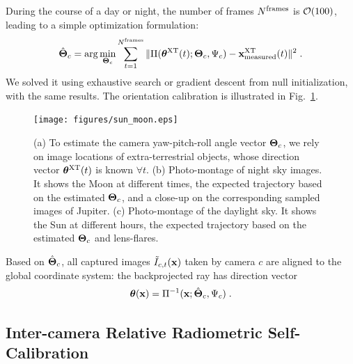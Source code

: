 \documentclass[runningheads]{llncs}
\begin{document}
During the course of a day or night, the number of frames
  $N^{\rm frames}$ is ${\cal O}(100)$, leading to a simple optimization formulation:
\begin{equation}
 \hat{\bf \Theta}_c=\arg\min_{{\bf \Theta}_c}
 \sum_{t=1}^{N^{\rm frames}}
 \|{\Pi}({\bm \theta}^{\rm XT}(t);{\bf \Theta}_c,\Psi_c) - {\bf x}^{\rm XT}_{\rm measured}(t)\|^2
\;.
 \label{eq:hatThetac}
\end{equation}
We solved it using exhaustive search or gradient descent from null initialization, with the same results. The orientation calibration is illustrated in Fig.~\ref{fig:sunmotion}.


\begin{figure}[t!]
\begin{center}
   \texttt{[image: figures/sun\_moon.eps]}
\end{center}
   \vspace{-0.6cm}
   \caption{(a) To estimate the camera yaw-pitch-roll angle vector ${\bf \Theta}_c$, we rely on
   image locations of extra-terrestrial objects, whose direction vector ${\bm \theta}^{\rm XT}(t)$
   is known $\forall t$. (b) Photo-montage of night sky images. It shows the Moon at different times, the expected trajectory based on the estimated ${\bf \Theta}_c$, and a close-up on the corresponding sampled images of Jupiter. (c) Photo-montage of the daylight sky. It shows the Sun at different hours, the expected trajectory based on the estimated ${\bf \Theta}_c$ and lens-flares.
   }
\label{fig:sunmotion}
\end{figure}
Based on $\hat{\bf \Theta}_c$, all captured images $\tilde I_{c,t}(\bf x)$ taken by camera $c$ are aligned to the global coordinate system:
the backprojected ray has direction vector %
\begin{equation}
 {\bm \theta}({\bf x})={\Pi}^{-1}({\bf x};\hat{\bf{\Theta}}_c,\Psi_c)
  \;.
 \label{eq:thetac}
\end{equation}



\subsection*{Inter-camera Relative Radiometric Self-Calibration}
\label{sec:mutiradio}
\end{document}
